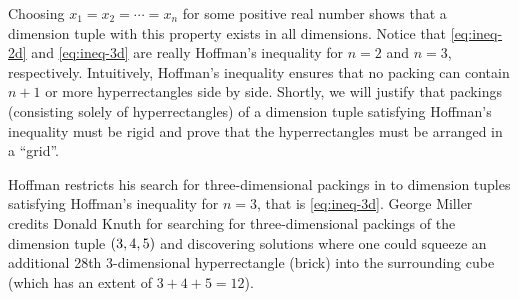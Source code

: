 \noindent Choosing $x_1 = x_2 = \dotsb = x_n$ for some positive real number shows that a dimension tuple with this property exists in all dimensions. Notice that \eqref{eq:ineq-2d} and \eqref{eq:ineq-3d} are really Hoffman's inequality for $n = 2$ and $n = 3$, respectively. Intuitively, Hoffman's inequality ensures that no packing can contain $n + 1$ or more hyperrectangles side by side. Shortly, we will justify that packings (consisting solely of hyperrectangles) of a dimension tuple satisfying Hoffman's inequality must be rigid and prove that the hyperrectangles must be arranged in a ``grid''.

Hoffman restricts his search for three-dimensional packings in \cite[p. 215]{Hoffman1981} to dimension tuples satisfying Hoffman's inequality for $n = 3$, that is \eqref{eq:ineq-3d}. George Miller \cite{Miller_2006} credits Donald Knuth for searching for three-dimensional packings of the dimension tuple $\left( 3, 4, 5 \right)$ and discovering solutions where one could squeeze an additional 28th 3-dimensional hyperrectangle (brick) into the surrounding cube (which has an extent of $3 + 4 + 5 = 12$).
